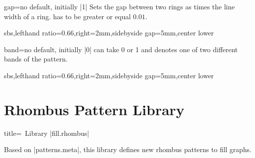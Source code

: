 \documentclass[a4paper,11pt]{article}
\begin{document}
\begin{myvoid}
\begin{docPatternKey}[][doc label=gap@hexcycle]{gap}{=}{no default, initially |1|}
  Sets the gap between two rings as  times the line width of a ring.
   has to be greater or equal $0.01$.

\begin{dispExample*}{sbs,lefthand ratio=0.66,right=2mm,sidebyside gap=5mm,center lower}
\end{dispExample*}
\end{docPatternKey}


\begin{docPatternKey}[][doc label=band@hexcycle]{band}{=}{no default, initially |0|}
   can take 0 or 1 and denotes one of two different bands of the pattern.
\begin{dispExample*}{sbs,lefthand ratio=0.66,right=2mm,sidebyside gap=5mm,center lower}
\end{dispExample*}
\end{docPatternKey}



\clearpage
\section{Rhombus Pattern Library}\label{sec:rhombus}%

\begin{dispListing*}{title=\tikzname\ Library |fill.rhombus|}
\usetikzlibrary{fill.rhombus} %
\usepackage{tikzfill.rhombus} %
\end{dispListing*}

Based on |patterns.meta|, this library defines new rhombus patterns to fill graphs.


\end{myvoid}
\end{document}
